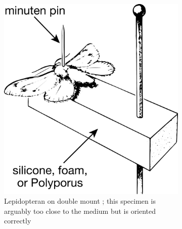 \begin{figure}[ht!]
\begin{subfigure}[ht!]{0.36\textwidth}
        \includegraphics[width=\textwidth]{sections/img/specimenPreps/doublemountMoth}
        \caption{Lepidopteran on double mount \citep[adapted from][Fig. 18D]{USDAmanual1986}; this specimen is arguably too close to the medium but is oriented correctly}
        \label{fig:mothmount}
    \end{subfigure}
    \caption{}\label{fig:doublemount}
\end{figure}

